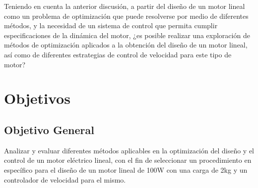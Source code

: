 Teniendo en cuenta la anterior discusión, a partir del diseño de un motor lineal como un problema de optimización que puede resolverse por medio de diferentes métodos, y la necesidad de un sistema de control que permita cumplir especificaciones de la dinámica del motor, ¿es posible realizar una exploración de métodos de optimización aplicados a la obtención del diseño de un motor lineal, así como de diferentes estrategias de control de velocidad para este tipo de motor?

\section{Objetivos}

\subsection{Objetivo General}
Analizar y evaluar diferentes métodos aplicables en la optimización del diseño y el control de un motor eléctrico lineal, con el fin de seleccionar un procedimiento en específico para el diseño de un motor lineal de 100W con una carga de 2kg y un controlador de velocidad para el mismo.

